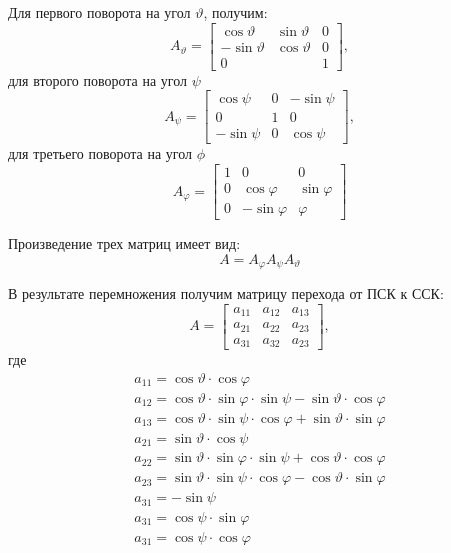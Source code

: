 Для первого поворота на угол $\vartheta$, получим: 
\begin{equation}
	A_\vartheta = \begin{bmatrix}
		\cos \vartheta & \sin \vartheta & 0 \\
		- \sin\vartheta & \cos \vartheta & 0 \\
		0 &	& 1 
	\end{bmatrix},
\end{equation}
для второго поворота на угол $\psi$
\begin{equation}
	A_\psi = \begin{bmatrix}
		\cos \psi & 0 & -\sin \psi  \\
		0 & 1 & 0 \\
		-\sin \psi & 0 & \cos \psi
	\end{bmatrix},
\end{equation}
для третьего поворота на угол $\phi$
\begin{equation}
	A_\varphi = \begin{bmatrix}
		1 & 0 & 0  \\
		0 & \cos \varphi & \sin \varphi \\
		0 & -\sin \varphi  & \varphi
	\end{bmatrix}
\end{equation}

Произведение трех матриц имеет вид:
\begin{equation}
	A = A_\varphi A_\psi A_\vartheta
\end{equation}

В результате перемножения получим матрицу перехода от ПСК к ССК: 
\begin{equation}
	A = \begin{bmatrix}
		a_{11} & a_{12} & a_{13} \\
		a_{21} & a_{22} & a_{23} \\
		a_{31} & a_{32} & a_{23} 
	\end{bmatrix},
\end{equation}
где
\begin{equation}
	\begin{gathered}
		a_{11} = \cos \vartheta \cdot \cos \varphi \\
		a_{12} = \cos \vartheta \cdot \sin \varphi \cdot \sin \psi - \sin \vartheta \cdot \cos \varphi \\
		a_{13} = \cos \vartheta \cdot \sin \psi \cdot \cos \varphi + \sin \vartheta \cdot \sin \varphi \\
		a_{21} = \sin \vartheta \cdot \cos \psi \\
		a_{22} = \sin \vartheta \cdot \sin \varphi \cdot \sin \psi + \cos \vartheta \cdot \cos \varphi \\
		a_{23} = \sin \vartheta \cdot \sin \psi \cdot \cos \varphi - \cos \vartheta \cdot \sin \varphi \\
		a_{31} = - \sin \psi \\
		a_{31} = \cos \psi \cdot \sin \varphi \\
		a_{31} = \cos \psi \cdot \cos \varphi \\
	\end{gathered}
\end{equation}

